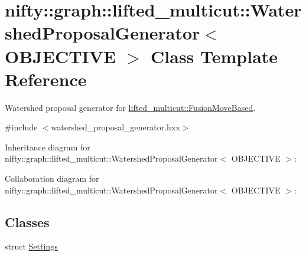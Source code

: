 \hypertarget{classnifty_1_1graph_1_1lifted__multicut_1_1WatershedProposalGenerator}{}\section{nifty\+:\+:graph\+:\+:lifted\+\_\+multicut\+:\+:Watershed\+Proposal\+Generator$<$ O\+B\+J\+E\+C\+T\+I\+V\+E $>$ Class Template Reference}
\label{classnifty_1_1graph_1_1lifted__multicut_1_1WatershedProposalGenerator}


Watershed proposal generator for \hyperlink{classnifty_1_1graph_1_1lifted__multicut_1_1FusionMoveBased}{lifted\+\_\+multicut\+::\+Fusion\+Move\+Based}.  




{\ttfamily \#include $<$watershed\+\_\+proposal\+\_\+generator.\+hxx$>$}



Inheritance diagram for nifty\+:\+:graph\+:\+:lifted\+\_\+multicut\+:\+:Watershed\+Proposal\+Generator$<$ O\+B\+J\+E\+C\+T\+I\+V\+E $>$\+:


Collaboration diagram for nifty\+:\+:graph\+:\+:lifted\+\_\+multicut\+:\+:Watershed\+Proposal\+Generator$<$ O\+B\+J\+E\+C\+T\+I\+V\+E $>$\+:
\subsection*{Classes}
\begin{DoxyCompactItemize}
\item 
struct \hyperlink{structnifty_1_1graph_1_1lifted__multicut_1_1WatershedProposalGenerator_1_1Settings}{Settings}
\end{DoxyCompactItemize}
